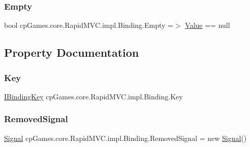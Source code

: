 \subsubsection{\texorpdfstring{Empty}{Empty}}
{\footnotesize\ttfamily bool cp\+Games.\+core.\+Rapid\+M\+V\+C.\+impl.\+Binding.\+Empty =$>$ \mbox{\hyperlink{classcp_games_1_1core_1_1_rapid_m_v_c_1_1impl_1_1_binding_a2475a9fdd0df65b35b71437974c5d116}{Value}} == null}



\subsection{Property Documentation}
\mbox{\label{classcp_games_1_1core_1_1_rapid_m_v_c_1_1impl_1_1_binding_a6c75caa9e8810b2bf42aa41ee05122af}} 
\subsubsection{\texorpdfstring{Key}{Key}}
{\footnotesize\ttfamily \mbox{\hyperlink{interfacecp_games_1_1core_1_1_rapid_m_v_c_1_1_i_binding_key}{I\+Binding\+Key}} cp\+Games.\+core.\+Rapid\+M\+V\+C.\+impl.\+Binding.\+Key\hspace{0.3cm}{\ttfamily [get]}}

\mbox{\label{classcp_games_1_1core_1_1_rapid_m_v_c_1_1impl_1_1_binding_a250ddde1caae1342223d266a15cac94a}} 
\subsubsection{\texorpdfstring{RemovedSignal}{RemovedSignal}}
{\footnotesize\ttfamily \mbox{\hyperlink{classcp_games_1_1core_1_1_rapid_m_v_c_1_1_signal}{Signal}} cp\+Games.\+core.\+Rapid\+M\+V\+C.\+impl.\+Binding.\+Removed\+Signal = new \mbox{\hyperlink{classcp_games_1_1core_1_1_rapid_m_v_c_1_1_signal}{Signal}}()\hspace{0.3cm}{\ttfamily [get]}}

